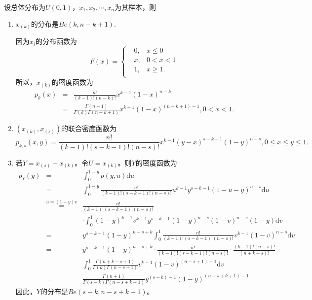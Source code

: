 \begin{example}
    设总体分布为$U(0,1)$，$x_1,x_2,\cdots,x_n$为其样本，则
\begin{enumerate}
    \item $x_{(k)}$的分布是$Be(k,n-k+1)$.

    因为$x_i$的分布函数为$$F(x) = 
    \left\{\begin{aligned}
    &0, & x\leq 0\\
     &   x, &0<x<1\\
     & 1 , & x\geq 1.\\
    \end{aligned}\right.
    $$
    所以，$x_{(k)}$的密度函数为
    \begin{eqnarray*}
        p_k(x) &=& \frac{n!}{(k-1)!(n-k)!} x^{k-1}(1-x)^{n-k} \\
        &=& \frac{\Gamma(n+1)}{\Gamma(k)\Gamma(n-k+1)} x^{k-1}(1-x)^{(n-k+1)-1}, 0<x<1.
    \end{eqnarray*}
    \item $(x_{(k)},x_{(s)})$的联合密度函数为
    $$
    p_{k,s}(x,y)=\frac{n!}{(k-1)!(s-k-1)!(n-s)!} x^{k-1}(y-x)^{s-k-1}(1-y)^{n-s}, 0\leq x\leq y\leq 1.
    $$
    \item 若$Y=x_{(s)}-x_{(k)}$。令$U=x_{(k)}$。则$Y$的密度函数为
    \begin{eqnarray*}
p_{Y}(y)&=&\int_{0}^{1-y} p(y, u) \text{d} u\\
&=&\int_{0}^{1-y} \frac{n !}{(k-1) !(s-k-1) !(n-s) !} u^{k-1} y^{s-k-1}(1-u-y)^{n-s} \text{d} u\\
&\overset{u=(1-y)v}{=}&\frac{n !}{(k-1) !(s-k-1) !(n-s) !}\\
&&\cdot\int_{0}^{1} (1-y)^{k-1} v^{k-1} y^{s-k-1}(1-y)^{n-s}(1-v)^{n-s}(1-y) \text{d} v\\
&=&y^{s-k-1}(1-y)^{n-s+k} \int_{0}^{1} \frac{n !}{(k-1) !(s-k-1) !(n-s) !} v^{k-1}(1-v)^{n-s} \text{d} v\\
&=& y^{s-k-1}(1-y)^{n-s+k} \cdot \frac{n!}{{(k-1)!}(s-k-1)!{(n-s)!}}\cdot \frac{{(k-1)!}{(n-s)!}}{(n+k-s)!}\\
&& \int_{0}^{1} \frac{\Gamma(n+k-s+1)}{\Gamma(k) \Gamma(n-s+1)} v^{k-1}(1-v)^{(n-s+1)-1} \text{d} v\\
&=&\frac{\Gamma(n+1)}{\Gamma(s-k) \Gamma(n-s+k+1)} y^{(s-k)-1}(1-y)^{(n-s+k+1)-1}
    \end{eqnarray*}
   因此，$Y$的分布是$Be(s-k,n-s+k+1)$。
\end{enumerate}    
\end{example}

